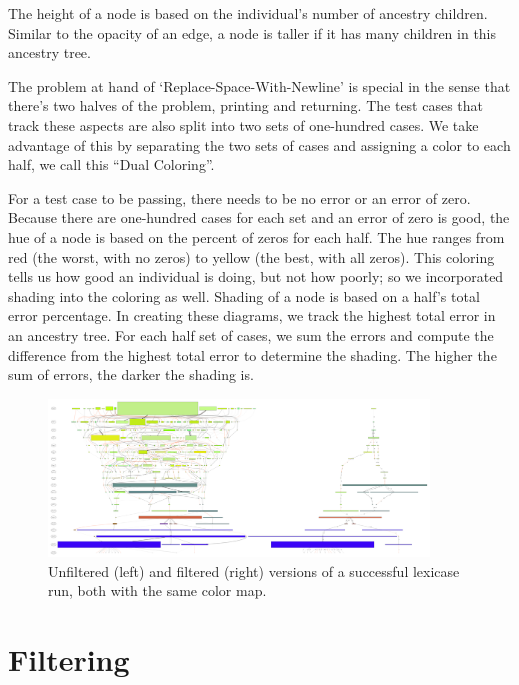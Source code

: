 \documentclass{sig-alternate}
\begin{document}
The height of a node is based on the individual's number of ancestry children. Similar to the opacity of an edge, a node is taller if it has many children in this ancestry tree. 


The problem at hand of `Replace-Space-With-Newline' is special in the sense that there's two halves of the problem, printing and returning. The test cases that track these aspects are also split into two sets of one-hundred cases. We take advantage of this by separating the two sets of cases and assigning a color to each half, we call this ``Dual Coloring''. 

For a test case to be passing, there needs to be no error or an error of zero. Because there are one-hundred cases for each set and an error of zero is good, the hue of a node is based on the percent of zeros for each half. The hue ranges from red (the worst, with no zeros) to yellow (the best, with all zeros). This coloring tells us how good an individual is doing, but not how poorly; so we incorporated shading into the coloring as well. Shading of a node is based on a half's total error percentage. In creating these diagrams, we track the highest total error in an ancestry tree. For each half set of cases, we sum the errors and compute the difference from the highest total error to determine the shading. The higher the sum of errors, the darker the shading is. 

\begin{figure}
	\begin{center}
		\includegraphics[width=0.9\textwidth]{../Figures/run0_RBM_color_filtered_and_full_30000.pdf}
	\end{center}
	\caption{Unfiltered (left) and filtered (right) versions of a successful lexicase run, both with the same color map.}
	\label{fig:lexRun0FilteredAndFull}
\end{figure}

\section{Filtering}
\label{sec:filtering}
\end{document}

